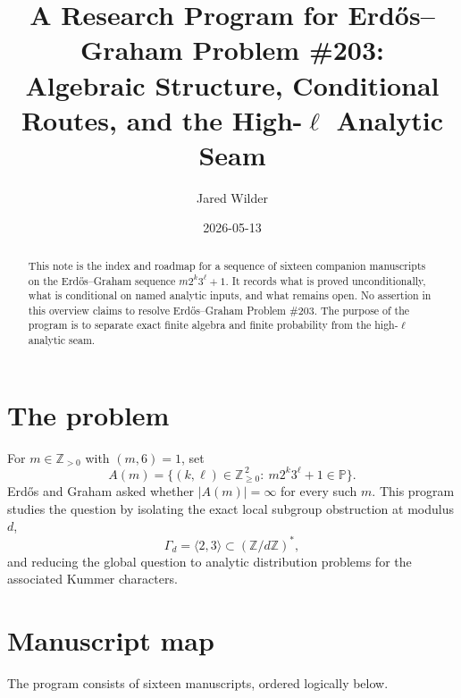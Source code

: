 \documentclass[11pt]{article}
\title{A Research Program for Erd\H{o}s--Graham Problem \#203:\\
Algebraic Structure, Conditional Routes, and the High-$\ell$ Analytic Seam}
\author{Jared Wilder}
\date{2026-05-13}
\newcommand{\Z}{\mathbb Z}
\newcommand{\1}{\mathbf 1}
\begin{document}
\maketitle

\begin{abstract}
This note is the index and roadmap for a sequence of sixteen companion manuscripts on the Erd\H{o}s--Graham sequence \(m2^k3^\ell+1\).  It records what is proved unconditionally, what is conditional on named analytic inputs, and what remains open.  No assertion in this overview claims to resolve Erd\H{o}s--Graham Problem \#203.  The purpose of the program is to separate exact finite algebra and finite probability from the high-\(\ell\) analytic seam.
\end{abstract}

\section{The problem}

For \(m\in\Z_{>0}\) with \((m,6)=1\), set
\[
A(m)=\bigl\{(k,\ell)\in\Z_{\ge0}^{\,2}:\ m2^k3^\ell+1\in\mathbb P\bigr\}.
\]
Erd\H{o}s and Graham asked whether \(|A(m)|=\infty\) for every such \(m\).  This program studies the question by isolating the exact local subgroup obstruction at modulus \(d\),
\[
\Gamma_d=\langle 2,3\rangle\subset(\Z/d\Z)^*,
\]
and reducing the global question to analytic distribution problems for the associated Kummer characters.

\section{Manuscript map}

The program consists of sixteen manuscripts, ordered logically below.
\end{document}
